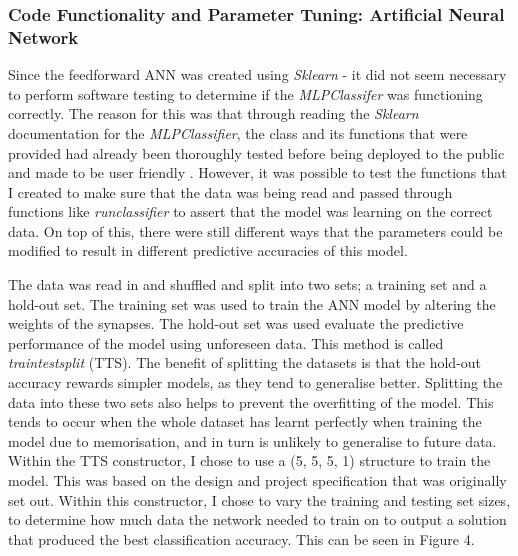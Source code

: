 \documentclass[11pt]{article}
\begin{document}
\subsubsection{Code Functionality and Parameter Tuning: Artificial Neural Network}\label{subsubsec:CFPT}
Since the feedforward ANN was created using \textit{Sklearn} - it did not seem necessary to perform software testing to determine if the \textit{MLPClassifer} was functioning correctly. The reason for this was that through reading the \textit{Sklearn} documentation for the \textit{MLPClassifier}, the class and its functions that were provided had already been thoroughly tested before being deployed to the public and made to be user friendly \cite{ref-sklearn,ref-absk}. However, it was possible to test the functions that I created to make sure that the data was being read and passed through functions like \textit{run\textunderscore classifier} to assert that the model was learning on the correct data. On top of this, there were still different ways that the parameters could be modified to result in different predictive accuracies of this model. 

The data was read in and shuffled and split into two sets;  a training set and a hold-out set. The training set was used to train the ANN model by altering the weights of the synapses. The hold-out set was used evaluate the predictive performance of the model using unforeseen data. This method is called \textit{train\textunderscore test\textunderscore split} (TTS). The benefit of splitting the datasets is that the hold-out accuracy rewards simpler models, as they tend to generalise better. Splitting the data into these two sets also helps to prevent the overfitting of the model. This tends to occur when the whole dataset has learnt perfectly when training the model due to memorisation, and in turn is unlikely to generalise to future data.
Within the TTS constructor, I chose to use a (5, 5, 5, 1) structure to train the model. This was based on the design and project specification that was originally set out. Within this constructor, I chose to vary the training and testing set sizes, to determine how much data the network needed to train on to output a solution that produced the best classification accuracy. This can be seen in Figure 4. 
\end{document}
